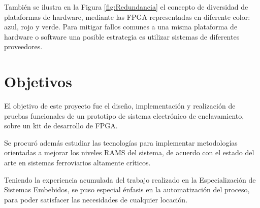 			También se ilustra en la Figura \ref{fig:Redundancia} el concepto de diversidad de plataformas de hardware, mediante las FPGA representadas en diferente color: azul, rojo y verde. Para mitigar fallos comunes a una misma plataforma de hardware o software una posible estrategia es utilizar sistemas de diferentes proveedores. %
			

	\section{Objetivos}
	
		El objetivo de este proyecto fue el diseño, implementación y realización de pruebas funcionales de un prototipo de sistema electrónico de enclavamiento, sobre un kit de desarrollo de FPGA. 
		
		Se procuró además estudiar las tecnologías para implementar metodologías orientadas a mejorar los niveles RAMS del sistema, de acuerdo con el estado del arte en sistemas ferroviarios altamente críticos. 
		
		Teniendo la experiencia acumulada del trabajo realizado en la Especialización de Sistemas Embebidos, se puso especial énfasis en la automatización del proceso, para poder satisfacer las necesidades de cualquier locación. 

